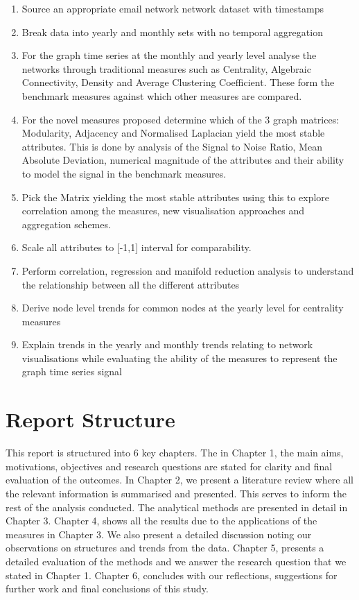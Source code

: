 \begin{enumerate}
    \item Source an appropriate email network network dataset with timestamps 
    \item Break data into yearly and monthly sets with no temporal aggregation
    \item For the graph time series at the monthly and yearly level analyse the networks through traditional measures such as Centrality, Algebraic Connectivity, Density and Average Clustering Coefficient. These form the benchmark measures against which other measures are compared.
    \item For the novel measures proposed determine which of the 3 graph matrices:  Modularity, Adjacency and Normalised Laplacian yield the most stable attributes. This is done by analysis of the Signal to Noise Ratio, Mean Absolute Deviation, numerical magnitude of the attributes and their ability to model the signal in the benchmark measures. 
    \item Pick the Matrix yielding the most stable attributes using this to explore correlation among the measures, new visualisation approaches and aggregation schemes.
    \item Scale all attributes to [-1,1] interval for comparability.
    \item Perform correlation, regression and manifold reduction analysis to understand the relationship between all the different attributes
    \item Derive node level trends for common nodes at the yearly level for centrality measures
    \item Explain trends in the yearly and monthly trends relating to network visualisations while evaluating the ability of the measures to represent the graph time series signal
\end{enumerate}

\section{Report Structure}

This report is structured into 6 key chapters. The in Chapter 1, the main aims, motivations, objectives and research questions are stated for clarity and final evaluation of the outcomes. In Chapter 2, we present a literature review where all the relevant information is summarised and presented. This serves to inform the rest of the analysis conducted. The analytical methods are presented in detail in Chapter 3. Chapter 4, shows all the results due to the applications of the measures in Chapter 3. We also present a detailed discussion noting our observations on structures and trends from the data. Chapter 5, presents a detailed evaluation of the methods and we answer the research question that we stated in Chapter 1. Chapter 6, concludes with our reflections, suggestions for further work and final conclusions of this study. 



 





